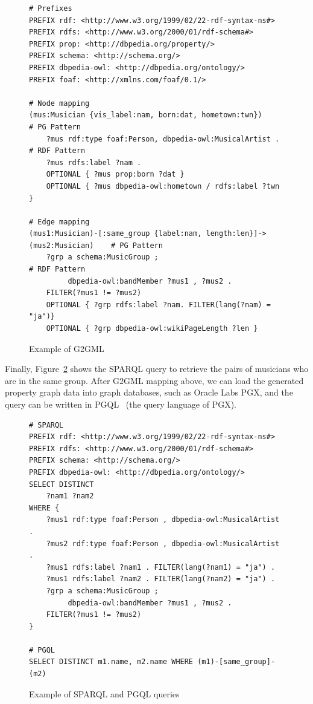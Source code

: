 \documentclass[runningheads]{llncs}
\begin{document}
\begin{figure}[!t]
\vspace{2mm}
\begin{scriptsize}
\begin{verbatim}
# Prefixes
PREFIX rdf: <http://www.w3.org/1999/02/22-rdf-syntax-ns#>
PREFIX rdfs: <http://www.w3.org/2000/01/rdf-schema#>
PREFIX prop: <http://dbpedia.org/property/>
PREFIX schema: <http://schema.org/>
PREFIX dbpedia-owl: <http://dbpedia.org/ontology/>
PREFIX foaf: <http://xmlns.com/foaf/0.1/>

# Node mapping
(mus:Musician {vis_label:nam, born:dat, hometown:twn})                    # PG Pattern
    ?mus rdf:type foaf:Person, dbpedia-owl:MusicalArtist .                # RDF Pattern
    ?mus rdfs:label ?nam .
    OPTIONAL { ?mus prop:born ?dat }
    OPTIONAL { ?mus dbpedia-owl:hometown / rdfs:label ?twn }

# Edge mapping
(mus1:Musician)-[:same_group {label:nam, length:len}]->(mus2:Musician)    # PG Pattern
    ?grp a schema:MusicGroup ;                                            # RDF Pattern
         dbpedia-owl:bandMember ?mus1 , ?mus2 .
    FILTER(?mus1 != ?mus2)
    OPTIONAL { ?grp rdfs:label ?nam. FILTER(lang(?nam) = "ja")}
    OPTIONAL { ?grp dbpedia-owl:wikiPageLength ?len }
\end{verbatim}
\end{scriptsize}
\caption{Example of G2GML}
\label{fig:g2gml}
\end{figure}

Finally, Figure~\ref{fig:sparql} shows the SPARQL query to retrieve the pairs of musicians who are in the same group. After G2GML mapping above, we can load the generated property graph data into graph databases, such as Oracle Labs PGX, and the query can be written in PGQL~\cite{pgql} (the query language of PGX).

\begin{figure}[!t]
\vspace{2mm}
\begin{scriptsize}
\begin{verbatim}
# SPARQL
PREFIX rdf: <http://www.w3.org/1999/02/22-rdf-syntax-ns#>
PREFIX rdfs: <http://www.w3.org/2000/01/rdf-schema#>
PREFIX schema: <http://schema.org/>
PREFIX dbpedia-owl: <http://dbpedia.org/ontology/>
SELECT DISTINCT
    ?nam1 ?nam2
WHERE {
    ?mus1 rdf:type foaf:Person , dbpedia-owl:MusicalArtist .
    ?mus2 rdf:type foaf:Person , dbpedia-owl:MusicalArtist .
    ?mus1 rdfs:label ?nam1 . FILTER(lang(?nam1) = "ja") .
    ?mus1 rdfs:label ?nam2 . FILTER(lang(?nam2) = "ja") .
    ?grp a schema:MusicGroup ;
         dbpedia-owl:bandMember ?mus1 , ?mus2 .
    FILTER(?mus1 != ?mus2)
}

# PGQL
SELECT DISTINCT m1.name, m2.name WHERE (m1)-[same_group]-(m2)
\end{verbatim}
\end{scriptsize}
\caption{Example of SPARQL and PGQL queries}
\label{fig:sparql}
\end{figure}
\end{document}
